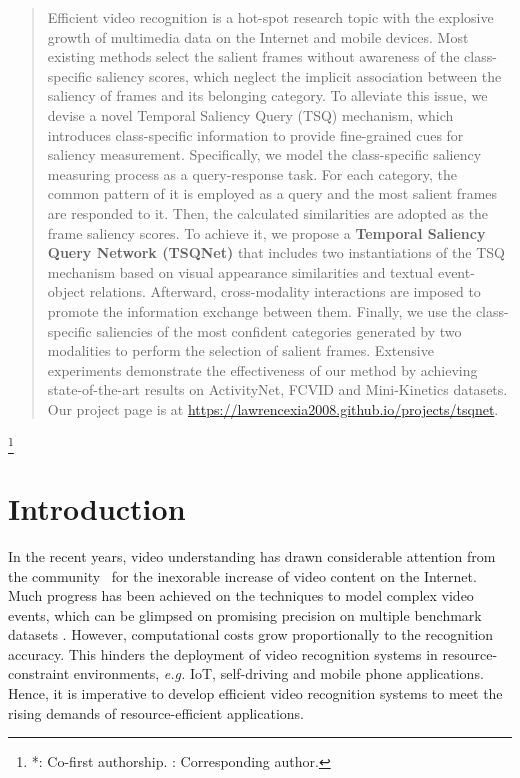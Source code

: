 \documentclass[runningheads]{llncs}
\newcommand\blfootnote[1]{\begingroup
  \renewcommand\thefootnote{}\footnote{#1}\addtocounter{footnote}{-1}\endgroup
}
\begin{document}
\begin{abstract}
Efficient video recognition is a hot-spot research topic with the explosive growth of multimedia data on the Internet and mobile devices. Most existing methods select the salient frames without awareness of the class-specific saliency scores, which neglect the implicit association between the saliency of frames and its belonging category. To alleviate this issue, we devise a novel Temporal Saliency Query (TSQ) mechanism, which introduces class-specific information to provide fine-grained cues for saliency measurement. Specifically, we model the class-specific saliency measuring process as a query-response task. For each category, the common pattern of it is employed as a query and the most salient frames are responded to it. Then, the calculated similarities are adopted as the frame saliency scores. To achieve it, we propose a \textbf{Temporal Saliency Query Network (TSQNet)} that includes two instantiations of the TSQ mechanism based on visual appearance similarities and textual event-object relations. Afterward, cross-modality interactions are imposed to promote the information exchange between them.
Finally, we use the class-specific saliencies of the most confident categories generated by two modalities to perform the selection of salient frames. Extensive experiments demonstrate the effectiveness of our method by achieving state-of-the-art results on ActivityNet, FCVID and Mini-Kinetics datasets. Our project page is at \url{https://lawrencexia2008.github.io/projects/tsqnet}.
\end{abstract}
\blfootnote{*: Co-first authorship. \Letter: Corresponding author.}

\section{Introduction}
In the recent years, video understanding has drawn considerable attention from the community~\cite{mamico,ASCNet,wu2021weakly,bcnet,Wu2022TransferringTK,wang2020symbiotic} for the inexorable increase of video content on the Internet. Much progress has been achieved on the techniques to model complex video events, which can be glimpsed on promising precision on multiple benchmark datasets \cite{kay2017kinetics,ucf101}. However, computational costs grow proportionally to the recognition accuracy. This hinders the deployment of video recognition systems in resource-constraint environments, \emph{e.g.} IoT, self-driving and mobile phone applications. Hence, it is imperative to develop efficient video recognition systems to meet the rising demands of resource-efficient applications.
\end{document}
